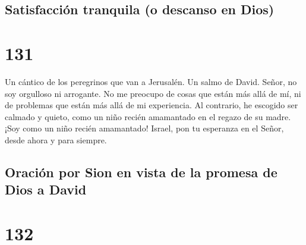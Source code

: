 \hypertarget{satisfacciuxf3n-tranquila-o-descanso-en-dios}{%
\subsection{Satisfacción tranquila (o descanso en
Dios)}\label{satisfacciuxf3n-tranquila-o-descanso-en-dios}}

\hypertarget{section-130}{%
\section{131}\label{section-130}}

Un cántico de los peregrinos que van a Jerusalén. Un salmo de David.
 Señor, no soy orgulloso ni arrogante. No me preocupo de
cosas que están más allá de mí, ni de problemas que están más allá de mi
experiencia.  Al contrario, he escogido ser calmado y
quieto, como un niño recién amamantado en el regazo de su madre. ¡Soy
como un niño recién amamantado!  Israel, pon tu esperanza
en el Señor, desde ahora y para siempre.

\hypertarget{oraciuxf3n-por-sion-en-vista-de-la-promesa-de-dios-a-david}{%
\subsection{Oración por Sion en vista de la promesa de Dios a
David}\label{oraciuxf3n-por-sion-en-vista-de-la-promesa-de-dios-a-david}}

\hypertarget{section-131}{%
\section{132}\label{section-131}}

